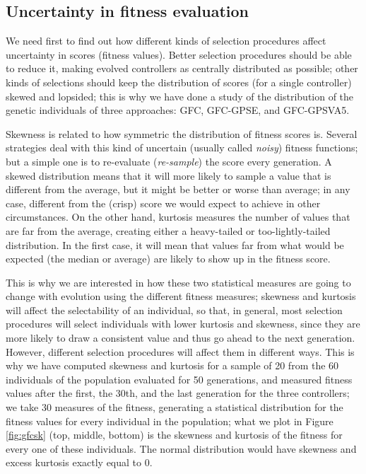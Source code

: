 \documentclass[10pt,journal,compsoc]{IEEEtran}
\begin{document}
\subsection{Uncertainty in fitness evaluation}

We need first to find out how different  kinds of selection procedures
affect uncertainty in scores (fitness values). Better selection procedures should be able to reduce it, making evolved controllers as centrally distributed
as possible; other kinds of selections should keep  the distribution of
scores (for a single controller) skewed and lopsided; this is why we
have done a study of the distribution of the genetic individuals of
three approaches: {\sf GFC}, {\sf GFC-GPSE}, and {\sf GFC-GPSVA5}. 


Skewness is related to how symmetric the distribution of fitness
scores is. Several strategies deal with this kind of
uncertain (usually called {\em noisy}) fitness functions; but a simple
one is to re-evaluate ({\em re-sample}) the score every generation. A
skewed distribution means that it will more likely to sample a value
that is different from the average, but it might be better or worse
than average; in any case, different from the (crisp) score we would expect to
achieve in other circumstances. On the other hand, kurtosis measures
the number of values that are far from the average, creating either a
heavy-tailed or too-lightly-tailed distribution. In the first case, it
will mean that values far from what would be expected (the median or average) are likely to
show up in the fitness score.

This is why we are interested in how these two statistical measures
are going to change with evolution using the different fitness measures; skewness and kurtosis will  affect the selectability of an individual, so that, in general, most selection procedures will select
individuals with lower kurtosis and skewness, since they are more
likely to draw a consistent value and thus go ahead to the next
generation. However, different selection procedures will affect them
in different ways. This is why we have computed
  skewness and kurtosis for a sample of 20 from the 60 individuals of
  the population evaluated for 50 generations, and measured fitness
  values after the first, the 30th, and the last generation for the three controllers; we take 30 measures of the
  fitness, generating a statistical distribution for the fitness
  values for every individual in the population; what we plot in
Figure \ref{fig:gfcsk} (top, middle, bottom) is the
  skewness and kurtosis of the fitness for every one of these
  individuals. The normal distribution would have skewness and
  excess kurtosis exactly equal to 0.
\end{document}

